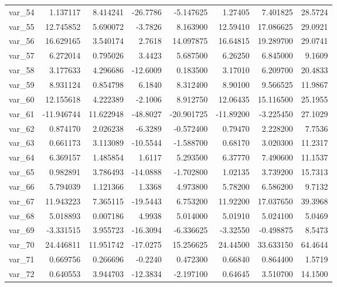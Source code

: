 ﻿\documentclass[12pt]{article}
\begin{document}
\begin{longtable}{lrrrrrrr}
  var\_54 &   1.137117 &   8.414241 & -26.7786 &  -5.147625 &   1.27405 &   7.401825 &  28.5724 \\
  var\_55 &  12.745852 &   5.690072 &  -3.7826 &   8.163900 &  12.59410 &  17.086625 &  29.0921 \\
  var\_56 &  16.629165 &   3.540174 &   2.7618 &  14.097875 &  16.64815 &  19.289700 &  29.0741 \\
  var\_57 &   6.272014 &   0.795026 &   3.4423 &   5.687500 &   6.26250 &   6.845000 &   9.1609 \\
  var\_58 &   3.177633 &   4.296686 & -12.6009 &   0.183500 &   3.17010 &   6.209700 &  20.4833 \\
  var\_59 &   8.931124 &   0.854798 &   6.1840 &   8.312400 &   8.90100 &   9.566525 &  11.9867 \\
  var\_60 &  12.155618 &   4.222389 &  -2.1006 &   8.912750 &  12.06435 &  15.116500 &  25.1955 \\
  var\_61 & -11.946744 &  11.622948 & -48.8027 & -20.901725 & -11.89200 &  -3.225450 &  27.1029 \\
  var\_62 &   0.874170 &   2.026238 &  -6.3289 &  -0.572400 &   0.79470 &   2.228200 &   7.7536 \\
  var\_63 &   0.661173 &   3.113089 & -10.5544 &  -1.588700 &   0.68170 &   3.020300 &  11.2317 \\
  var\_64 &   6.369157 &   1.485854 &   1.6117 &   5.293500 &   6.37770 &   7.490600 &  11.1537 \\
  var\_65 &   0.982891 &   3.786493 & -14.0888 &  -1.702800 &   1.02135 &   3.739200 &  15.7313 \\
  var\_66 &   5.794039 &   1.121366 &   1.3368 &   4.973800 &   5.78200 &   6.586200 &   9.7132 \\
  var\_67 &  11.943223 &   7.365115 & -19.5443 &   6.753200 &  11.92200 &  17.037650 &  39.3968 \\
  var\_68 &   5.018893 &   0.007186 &   4.9938 &   5.014000 &   5.01910 &   5.024100 &   5.0469 \\
  var\_69 &  -3.331515 &   3.955723 & -16.3094 &  -6.336625 &  -3.32550 &  -0.498875 &   8.5473 \\
  var\_70 &  24.446811 &  11.951742 & -17.0275 &  15.256625 &  24.44500 &  33.633150 &  64.4644 \\
  var\_71 &   0.669756 &   0.266696 &  -0.2240 &   0.472300 &   0.66840 &   0.864400 &   1.5719 \\
  var\_72 &   0.640553 &   3.944703 & -12.3834 &  -2.197100 &   0.64645 &   3.510700 &  14.1500 \\

\end{longtable}
\end{document}
